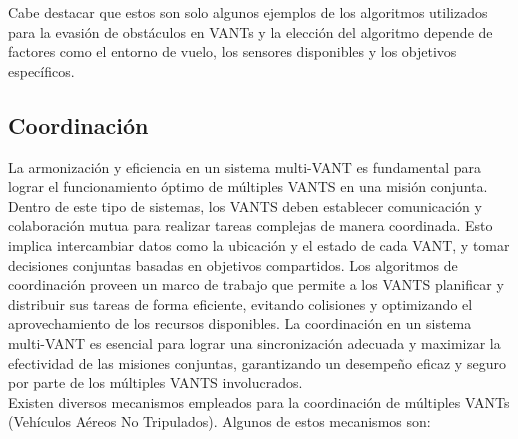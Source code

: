 \documentclass[sigconf]{acmart}
\begin{document}
Cabe destacar que estos son solo algunos ejemplos de los algoritmos utilizados para la evasión de obstáculos en VANTs y la elección del algoritmo depende de factores como el entorno de vuelo, los sensores disponibles y los objetivos específicos.

\subsection*{Coordinación}

La armonización y eficiencia en un sistema multi-VANT es fundamental para lograr el funcionamiento óptimo de múltiples VANTS en una misión conjunta. Dentro de este tipo de sistemas, los VANTS deben establecer comunicación y colaboración mutua para realizar tareas complejas de manera coordinada. Esto implica intercambiar datos como la ubicación y el estado de cada VANT, y tomar decisiones conjuntas basadas en objetivos compartidos. Los algoritmos de coordinación proveen un marco de trabajo que permite a los VANTS planificar y distribuir sus tareas de forma eficiente, evitando colisiones y optimizando el aprovechamiento de los recursos disponibles. La coordinación en un sistema multi-VANT es esencial para lograr una sincronización adecuada y maximizar la efectividad de las misiones conjuntas, garantizando un desempeño eficaz y seguro por parte de los múltiples VANTS involucrados.\\
Existen diversos mecanismos empleados para la coordinación de múltiples VANTs (Vehículos Aéreos No Tripulados). Algunos de estos mecanismos son:
\end{document}
